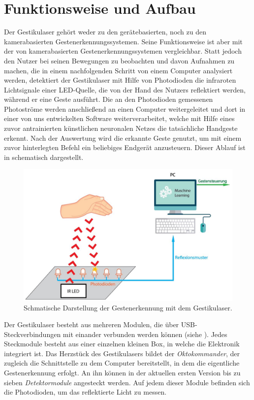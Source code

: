 \chapter{Funktionsweise und Aufbau}
\label{ch:Aufbau}

Der Gestikulaser gehört weder zu den gerätebasierten, noch zu den kamerabasierten Gestenerkennungssystemen. Seine Funktionsweise ist aber mit der von kamerabasierten Gestenerkennungssystemen vergleichbar. Statt jedoch den Nutzer bei seinen Bewegungen zu beobachten und davon Aufnahmen zu machen, die in einem nachfolgenden Schritt von einem Computer analysiert werden, detektiert der Gestikulaser mit Hilfe von Photodioden die infraroten Lichtsignale einer LED-Quelle, die von der Hand des Nutzers reflektiert werden, während er eine Geste ausführt. Die an den Photodioden gemessenen Photoströme werden anschließend an einen Computer weitergeleitet und dort in einer von uns entwickelten Software weiterverarbeitet, welche mit Hilfe eines zuvor antrainierten künstlichen neuronalen Netzes die tatsächliche Handgeste erkennt. Nach der Auswertung wird die erkannte Geste genutzt, um mit einem zuvor hinterlegten Befehl ein beliebiges Endgerät anzusteuern. Dieser Ablauf ist in  schematisch dargestellt. \\
\begin{figure}[H]
	\centering
	\includegraphics[width=14cm]{../figures/AblaufGestikulaser2.jpg}
	\caption{Schmatische Darstellung der Gestenerkennung mit dem Gestikulaser.}
	\label{fig:AblaufGestikulaser}
\end{figure}
\noindent
Der Gestikulaser besteht aus mehreren Modulen, die über USB-Steckverbindungen mit einander verbunden werden können (siehe ). Jedes Steckmodule besteht aus einer einzelnen kleinen Box, in welche die Elektronik integriert ist. Das Herzstück des Gestikulasers bildet der \textit{Oktokommander}, der zugleich die Schnittstelle zu dem Computer bereitstellt, in dem die eigentliche Gestenerkennung erfolgt. An ihn können in der aktuellen ersten Version bis zu sieben \textit{Detektormodule} angesteckt werden. Auf jedem dieser Module befinden sich die Photodioden, um das reflektierte Licht zu messen. 
